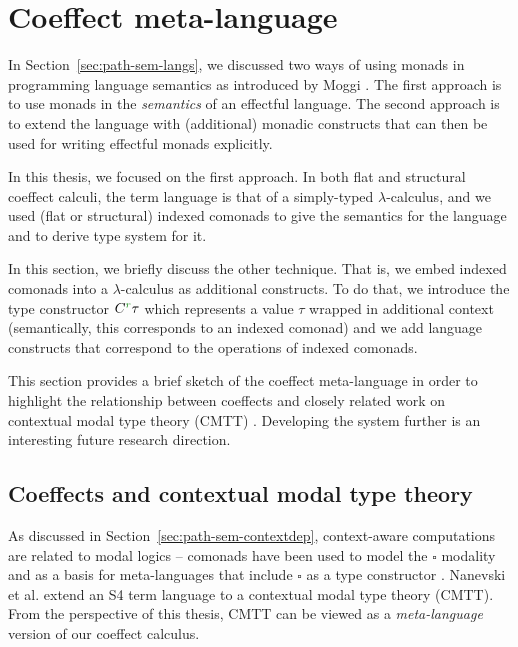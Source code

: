 \section{Coeffect meta-language}
\label{sec:further-meta}

In Section~\ref{sec:path-sem-langs}, we discussed two ways of using monads in programming
language semantics as introduced by Moggi \cite{monad-notions}. The first approach is to use
monads in the \emph{semantics} of an effectful language. The second approach is to extend the
language with (additional) monadic constructs that can then be used for writing effectful
monads explicitly.

In this thesis, we focused on the first approach. In both flat and structural coeffect calculi,
the term language is that of a simply-typed $\lambda$-calculus, and we used (flat or structural)
indexed comonads to give the semantics for the language and to derive type system for it.

In this section, we briefly discuss the other technique. That is, we embed indexed
comonads into a $\lambda$-calculus as additional constructs. To do that, we introduce the
type constructor $\ctyp{\cclrd{r}}{\tau}$ which represents a value $\tau$ wrapped in additional
context (semantically, this corresponds to an indexed comonad) and we add language constructs
that correspond to the operations of indexed comonads.

This section provides a brief sketch of the coeffect meta-language in order to highlight the relationship
between coeffects and closely related work on contextual modal type theory (CMTT) \cite{logic-cmtt}.
Developing the system further is an interesting future research direction.


\subsection{Coeffects and contextual modal type theory}

As discussed in Section~\ref{sec:path-sem-contextdep}, context-aware computations are related
to modal logics -- comonads have been used to model the $\square$ modality and as a basis for
meta-languages that include $\square$ as a type constructor
\cite{logic-intuitionistic-modal,logic-modal-reconstruction,logic-intuitionistic-modal,logic-cmtt}.
Nanevski et al. \cite{logic-cmtt} extend an S4 term language to a contextual modal type theory (CMTT).
From the perspective of this thesis, CMTT can be viewed as a \emph{meta-language} version of our
coeffect calculus.

